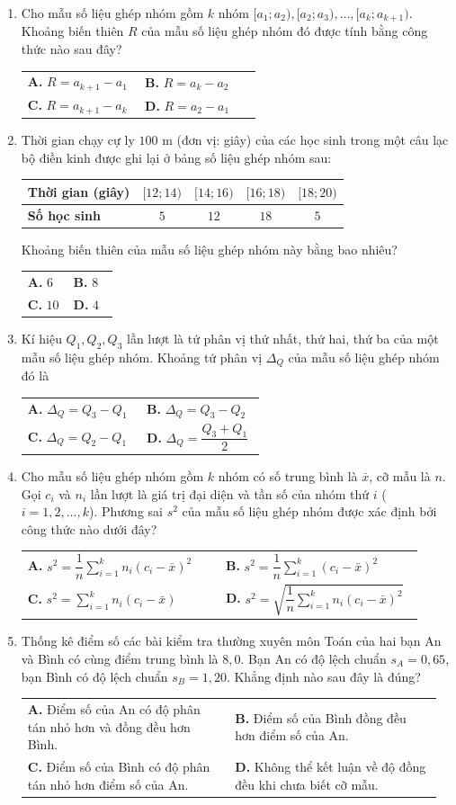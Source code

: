 \documentclass[12pt,a4paper]{article}
\makeatletter
\newcommand{\bonpa}[4]{\par\nobreak\smallskip\nobreak\noindent
\begin{tabular}{@{}p{0.48\linewidth}p{0.48\linewidth}@{}}
\textbf{A.} #1 & \textbf{B.} #2\\[7pt]
\textbf{C.} #3 & \textbf{D.} #4\end{tabular}}
\makeatother
\begin{document}
\begin{enumerate}
\item Cho mẫu số liệu ghép nhóm gồm $k$ nhóm $[a_1; a_2), [a_2; a_3), \dots, [a_k; a_{k+1})$. Khoảng biến thiên $R$ của mẫu số liệu ghép nhóm đó được tính bằng công thức nào sau đây?
\bonpa{$R = a_{k+1} - a_1$}{$R = a_k - a_2$}{$R = a_{k+1} - a_k$}{$R = a_2 - a_1$}

\item Thời gian chạy cự ly $100\text{ m}$ (đơn vị: giây) của các học sinh trong một câu lạc bộ điền kinh được ghi lại ở bảng số liệu ghép nhóm sau:
\begin{center}
\begin{tabular}{|l|c|c|c|c|}
\hline
\textbf{Thời gian (giây)} & $[12; 14)$ & $[14; 16)$ & $[16; 18)$ & $[18; 20)$ \\ \hline
\textbf{Số học sinh} & $5$ & $12$ & $18$ & $5$ \\ \hline
\end{tabular}
\end{center}
Khoảng biến thiên của mẫu số liệu ghép nhóm này bằng bao nhiêu?
\bonpa{$6$}{$8$}{$10$}{$4$}

\item Kí hiệu $Q_1, Q_2, Q_3$ lần lượt là tứ phân vị thứ nhất, thứ hai, thứ ba của một mẫu số liệu ghép nhóm. Khoảng tứ phân vị $\Delta_Q$ của mẫu số liệu ghép nhóm đó là
\bonpa{$\Delta_Q = Q_3 - Q_1$}{$\Delta_Q = Q_3 - Q_2$}{$\Delta_Q = Q_2 - Q_1$}{$\Delta_Q = \dfrac{Q_3 + Q_1}{2}$}

\item Cho mẫu số liệu ghép nhóm gồm $k$ nhóm có số trung bình là $\bar{x}$, cỡ mẫu là $n$. Gọi $c_i$ và $n_i$ lần lượt là giá trị đại diện và tần số của nhóm thứ $i$ ($i = 1, 2, \dots, k$). Phương sai $s^2$ của mẫu số liệu ghép nhóm được xác định bởi công thức nào dưới đây?
\bonpa{$s^2 = \dfrac{1}{n}\sum\limits_{i=1}^k n_i (c_i - \bar{x})^2$}{$s^2 = \dfrac{1}{n}\sum\limits_{i=1}^k (c_i - \bar{x})^2$}{$s^2 = \sum\limits_{i=1}^k n_i (c_i - \bar{x})$}{$s^2 = \sqrt{\dfrac{1}{n}\sum\limits_{i=1}^k n_i (c_i - \bar{x})^2}$}

\item Thống kê điểm số các bài kiểm tra thường xuyên môn Toán của hai bạn An và Bình có cùng điểm trung bình là $8{,}0$. Bạn An có độ lệch chuẩn $s_A = 0{,}65$, bạn Bình có độ lệch chuẩn $s_B = 1{,}20$. Khẳng định nào sau đây là đúng?
\bonpa{Điểm số của An có độ phân tán nhỏ hơn và đồng đều hơn Bình.}{Điểm số của Bình đồng đều hơn điểm số của An.}{Điểm số của Bình có độ phân tán nhỏ hơn điểm số của An.}{Không thể kết luận về độ đồng đều khi chưa biết cỡ mẫu.}
\end{enumerate}
\end{document}

